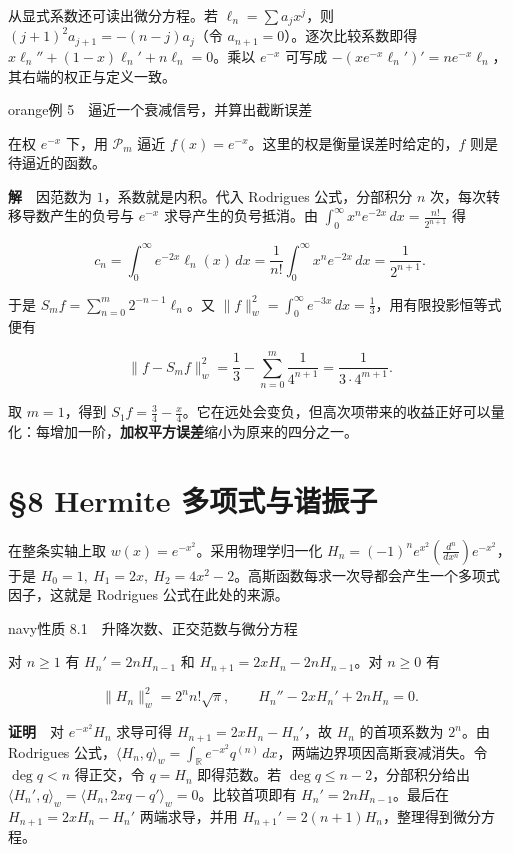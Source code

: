 \documentclass[11pt,a4paper]{article}
\newcommand{\lectureheading}[1]{\section{#1}}
\begin{document}
从显式系数还可读出微分方程。若 \(\ell_n=\sum a_jx^j\)，则 \((j+1)^2a_{j+1}=-(n-j)a_j\)（令 \(a_{n+1}=0\)）。逐次比较系数即得 \(x\ell_n''+(1-x)\ell_n'+n\ell_n=0\)。乘以 \(e^{-x}\) 可写成 \(-(xe^{-x}\ell_n')'=ne^{-x}\ell_n\)，其右端的权正与定义一致。

\begin{sboxenv}{orange}{例 5　逼近一个衰减信号，并算出截断误差}

在权 \(e^{-x}\) 下，用 \(\mathcal P_m\) 逼近 \(f(x)=e^{-x}\)。这里的权是衡量误差时给定的，\(f\) 则是待逼近的函数。

\end{sboxenv}

\textbf{解}　因范数为 \(1\)，系数就是内积。代入 Rodrigues 公式，分部积分 \(n\) 次，每次转移导数产生的负号与 \(e^{-x}\) 求导产生的负号抵消。由 \(\int_0^\infty x^ne^{-2x}\,dx=\frac{n!}{2^{n+1}}\) 得

\[
c_n=\int_0^\infty e^{-2x}\ell_n(x)\,dx
=\frac1{n!}\int_0^\infty x^ne^{-2x}\,dx=\frac1{2^{n+1}} .
\]

于是 \(S_m f=\sum_{n=0}^m2^{-n-1}\ell_n\)。又 \(\|f\|_w^2=\int_0^\infty e^{-3x}\,dx=\frac{1}{3}\)，用有限投影恒等式便有

\[
\|f-S_m f\|_w^2=\frac13-\sum_{n=0}^m\frac1{4^{n+1}}
=\frac{1}{3\cdot4^{m+1}} .
\]

取 \(m=1\)，得到 \(S_1f=\frac{3}{4}-\frac{x}{4}\)。它在远处会变负，但高次项带来的收益正好可以量化：每增加一阶，\textbf{加权平方误差}缩小为原来的四分之一。

\clearpage\lectureheading{§8 Hermite 多项式与谐振子}

在整条实轴上取 \(w(x)=e^{-x^2}\)。采用物理学归一化 \(H_n=(-1)^ne^{x^2}(\frac{d^n}{dx^n})e^{-x^2}\)，于是 \(H_0=1,\ H_1=2x,\ H_2=4x^2-2\)。高斯函数每求一次导都会产生一个多项式因子，这就是 Rodrigues 公式在此处的来源。

\begin{sboxenv}{navy}{性质 8.1　升降次数、正交范数与微分方程}

对 \(n\ge1\) 有 \(H_n'=2nH_{n-1}\) 和 \(H_{n+1}=2xH_n-2nH_{n-1}\)。对 \(n\ge0\) 有

\[
\|H_n\|_w^2=2^n n!\sqrt\pi,\qquad H_n''-2xH_n'+2nH_n=0 .
\]

\end{sboxenv}

\textbf{证明}　对 \(e^{-x^2}H_n\) 求导可得 \(H_{n+1}=2xH_n-H_n'\)，故 \(H_n\) 的首项系数为 \(2^n\)。由 Rodrigues 公式，\(\langle H_n,q\rangle_w=\int_{\mathbb R}e^{-x^2}q^{(n)}\,dx\)，两端边界项因高斯衰减消失。令 \(\deg q<n\) 得正交，令 \(q=H_n\) 即得范数。若 \(\deg q\le n-2\)，分部积分给出 \(\langle H_n',q\rangle_w=\langle H_n,2xq-q'\rangle_w=0\)。比较首项即有 \(H_n'=2nH_{n-1}\)。最后在 \(H_{n+1}=2xH_n-H_n'\) 两端求导，并用 \(H_{n+1}'=2(n+1)H_n\)，整理得到微分方程。
\end{document}
